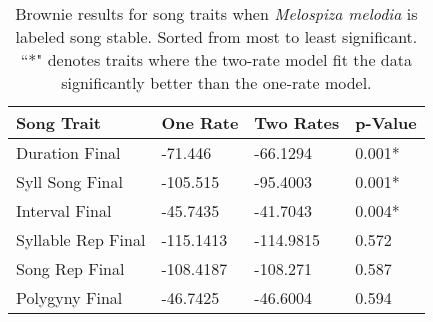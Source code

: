 \documentclass[a4paper,12pt]{article}
\begin{document}
\begin{table}[ht]
\caption{Brownie results for song traits when \textit{Melospiza melodia} is labeled song stable.  Sorted from most to least significant.  ``*" denotes traits where the two-rate model fit the data significantly better than the one-rate model.}
\centering
\begin{tabular}{llll}
  \hline
Song Trait & One Rate & Two Rates & p-Value \\ 
  \hline
Duration Final & -71.446 & -66.1294 & 0.001* \\ 
  Syll Song Final & -105.515 & -95.4003 & 0.001* \\ 
  Interval Final & -45.7435 & -41.7043 & 0.004* \\ 
  Syllable Rep Final & -115.1413 & -114.9815 & 0.572 \\ 
  Song Rep Final & -108.4187 & -108.271 & 0.587 \\ 
  Polygyny Final & -46.7425 & -46.6004 & 0.594 \\ 
   \hline
   \end{tabular}
\end{table}
\end{document}
